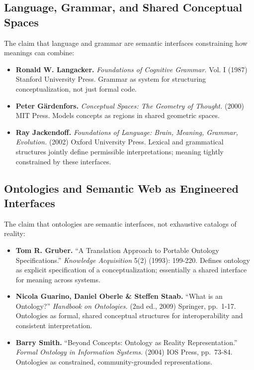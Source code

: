 \documentclass[
  openright]{book}
\begin{document}
\subsection{Language, Grammar, and Shared Conceptual
Spaces}\label{language-grammar-and-shared-conceptual-spaces}

The claim that language and grammar are semantic interfaces constraining
how meanings can combine:

\begin{itemize}
\item
  \textbf{Ronald W. Langacker.} \emph{Foundations of Cognitive Grammar.}
  Vol. I (1987) Stanford University Press. Grammar as system for
  structuring conceptualization, not just formal code.
\item
  \textbf{Peter Gärdenfors.} \emph{Conceptual Spaces: The Geometry of
  Thought.} (2000) MIT Press. Models concepts as regions in shared
  geometric spaces.
\item
  \textbf{Ray Jackendoff.} \emph{Foundations of Language: Brain,
  Meaning, Grammar, Evolution.} (2002) Oxford University Press. Lexical
  and grammatical structures jointly define permissible interpretations;
  meaning tightly constrained by these interfaces.
\end{itemize}

\subsection{Ontologies and Semantic Web as Engineered
Interfaces}\label{ontologies-and-semantic-web-as-engineered-interfaces}

The claim that ontologies are semantic interfaces, not exhaustive
catalogs of reality:

\begin{itemize}
\item
  \textbf{Tom R. Gruber.} ``A Translation Approach to Portable Ontology
  Specifications.'' \emph{Knowledge Acquisition} 5(2) (1993): 199-220.
  Defines ontology as explicit specification of a conceptualization;
  essentially a shared interface for meaning across systems.
\item
  \textbf{Nicola Guarino, Daniel Oberle \& Steffen Staab.} ``What is an
  Ontology?'' \emph{Handbook on Ontologies.} (2nd ed., 2009) Springer,
  pp.~1-17. Ontologies as formal, shared conceptual structures for
  interoperability and consistent interpretation.
\item
  \textbf{Barry Smith.} ``Beyond Concepts: Ontology as Reality
  Representation.'' \emph{Formal Ontology in Information Systems.}
  (2004) IOS Press, pp.~73-84. Ontologies as constrained,
  community-grounded representations.
\end{itemize}
\end{document}
